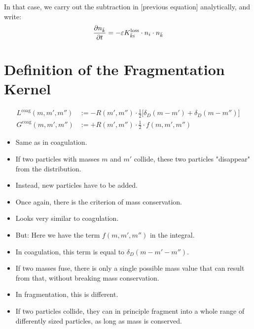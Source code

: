         In that case, we carry out the subtraction in [previous equation] analytically, and write:
        \begin{equation}
            \frac{\partial n_{\bar k}}{\partial t}
                =-\varepsilon K_{\bar ki}^{\text{loss}}\cdot n_i\cdot n_{\bar k}
        \end{equation}
    
        


\section{Definition of the Fragmentation Kernel}

    \begin{align}
        L^\text{coag}(m, m', m'') 
            &:= -R(m',m'') \cdot \frac{1}{2} \bigg[\delta_D(m-m')+\delta_D(m-m'')\bigg] \\
        G^\text{coag}(m, m', m'') 
            &:= +R(m',m'') \cdot \frac{1}{2} \cdot f(m,m',m'')
    \end{align}

    \begin{itemize}
        \item Same as in coagulation.
        \item If two particles with masses $m$ and $m'$ collide, these two particles "disappear"
              from the distribution.
        \item Instead, new particles have to be added.
        \item Once again, there is the criterion of mass conservation.
    \end{itemize}

    \begin{itemize}
        \item Looks very similar to coagulation.
        \item But: Here we have the term $f(m,m',m'')$ in the integral.
        \item In coagulation, this term is equal to $\delta_D(m-m'-m'')$.
        \item If two masses fuse, there is only a single possible mass value that can result from 
              that, without breaking mass conservation.
        \item In fragmentation, this is different.
        \item If two particles collide, they can in principle fragment into a whole range of 
              differently sized particles, as long as mass is conserved.
    \end{itemize}

